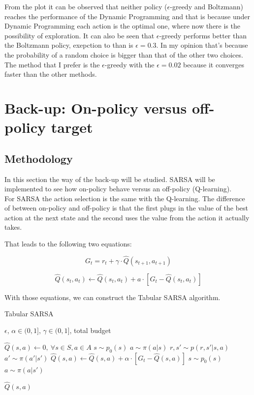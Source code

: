 \documentclass{article}
\begin{document}
From the plot it can be observed that neither policy ($\epsilon$-greedy and Boltzmann) reaches the performance of 
the Dynamic Programming and that is because under Dynamic Programming each action is the optimal one, where now there is the 
possibility of exploration. It can also be seen that $\epsilon$-greedy performs better than the Boltzmann policy, exepction to than is 
$\epsilon = 0.3$. In my opinion that's because the probability of a random choice is bigger than that of the other two choices. 
The method that I prefer is the $\epsilon$-greedy with the $\epsilon = 0.02$ because it converges faster than the other methods.

\section{Back-up: On-policy versus off-policy target} \label{sec:Policy}
\subsection{Methodology}
In this section the way of the back-up will be studied. SARSA will be implemented to see how on-policy behave versus an off-policy (Q-learning).\\
For SARSA the action selection is the same with the Q-learning.
The difference of between on-policy and off-policy is that the first plugs in the value of the best action at the next state and the second uses the value from the action it actually takes.

That leads to the following two equations:

\begin{equation}
    G_t = r_t + \gamma \cdot \hat{Q}(s_{t+1},a_{t+1})
    \label{eq:Sarga G_t}
\end{equation}

\begin{equation}
    \hat{Q}(s_t,a_t) \leftarrow \hat{Q}(s_t,a_t) + a \cdot [G_t - \hat{Q}(s_t,a_t)]
\end{equation}

With those equations, we can construct the Tabular SARSA algorithm.

\begin{algorithm}[h]
    \caption{Tabular SARSA}
    \label{alg:Tabular SARSA}
 \begin{algorithmic}
     $\epsilon $, $\alpha \in (0,1]$, $\gamma \in (0,1]$, total budget
    
    \STATE $\hat{Q}(s,a) \leftarrow 0,\ \forall s \in S, a \in A$
    \STATE $s \sim p_0(s)$
    \STATE $a \sim \pi(a|s)$
        \STATE $r,s' \sim p(r,s'|s,a)$
        \STATE $a' \sim \pi(a'|s')$
        \STATE $\hat{Q}(s,a) \leftarrow \hat{Q}(s,a) + \alpha \cdot [G_t - \hat{Q}(s,a)]$
        \STATE $s \sim  p_0(s)$
        \STATE $a \sim \pi(a|s')$
        \ENDIF
        \ENDWHILE
    
     $\hat{Q}(s,a)$
 \end{algorithmic}
\end{algorithm}
\end{document}
